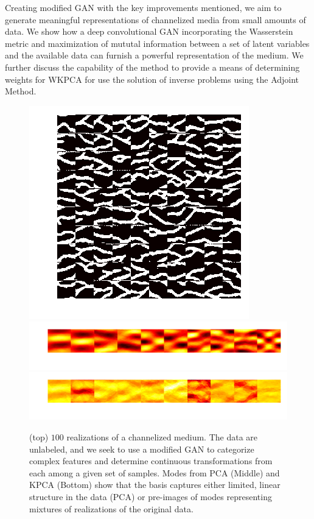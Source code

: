 \documentclass{article}
\begin{document}
	Creating modified GAN with the key improvements mentioned, we aim to generate meaningful representations of channelized media from small amounts of data.  We show how a deep convolutional GAN incorporating the Wasserstein metric and maximization of mututal information between a set of latent variables and the available data can furnish a powerful representation of the medium.  We further discuss the capability of the method to provide a means of determining weights for WKPCA for use the solution of inverse problems using the Adjoint Method. 

\begin{figure}[h]
  \centering
  \includegraphics{figures/OptSnapshots_32.png}
  \includegraphics{figures/OptSnapshots_32_Modes.png}
  \includegraphics{figures/OptSnapshots_32_Modes_KPCA.png}
  \caption{(top) $100$ realizations of a channelized medium.  The data are unlabeled, and  we seek to use a modified GAN to categorize complex features and determine continuous transformations from each among a given set of samples. Modes from PCA (Middle) and KPCA (Bottom) show that the basis captures either limited, linear structure in the data (PCA) or pre-images of modes representing mixtures of realizations of the original data.}
\end{figure}
\end{document}
